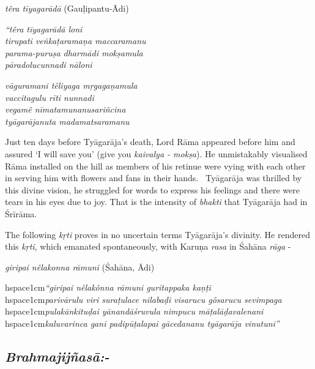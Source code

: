 \textit{têra tīyagarādā} (Gauḷipantu-Ādi)

\begin{centerquote}
\textit{“têra tīyagarādā loni}\\ \textit{tirupati veṅkaṭaramaṇa maccaramanu}\\ \textit{parama-puruṣa dharmādi mokṣamula}\\ \textit{pāradolucunnadi nāloni}
\end{centerquote}

\begin{centerquote}
\textit{vāguramani têliyaga mṛgagaṇamula}\\ \textit{vaccitagulu rīti nunnadi}\\ \textit{vegamê nīmatamunanusariñcina}\\ \textit{tyāgarājanuta madamatsaramanu}
\end{centerquote}

Just ten days before Tyāgarāja’s death, Lord Rāma appeared before him and assured ‘I will save you’ (give you \textit{kaivalya - mokṣa}). He unmistakably visualised Rāma installed on the hill as members of his retinue were vying with each other in serving him with flowers and fans in their hands.  Tyāgarāja was thrilled by this divine vision, he struggled for words to express his feelings and there were tears in his eyes due to joy. That is the intensity of \textit{bhakti} that Tyāgarāja had in Śrīrāma.

The following \textit{kṛti} proves in no uncertain terms Tyāgarāja’s divinity. He rendered this \textit{kṛti}, which emanated spontaneously, with Karuṇa \textit{rasa} in Śahāna \textit{rāga} - 

\textit{giripai nêlakonna rāmuni} (Śahāna, Ādi)

\begin{myquote}
hspace{1cm}\textit{“giripai nêlakônna rāmuni guritappaka kaṇṭi} \\ hspace{1cm}\textit{parivārulu viri suraṭulace nilabaḍi visarucu gôsarucu sevimpaga}\\ hspace{1cm}\textit{pulakānkituḍai yānandāśruvula nimpucu māṭalāḍavalenani}\\ hspace{1cm}\textit{kaluvarinca gani padipūṭalapai gācedananu tyāgarāja vinutuni”}
\end{myquote}


\subsection*{\textit{Brahmajijñasā:-}}

